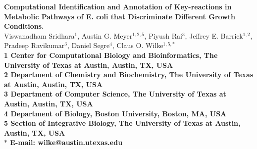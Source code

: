 \documentclass[12pt]{article}
\date{}
\begin{document}
\begin{flushleft}
{\Large
\textbf{Computational Identification and Annotation of Key-reactions in Metabolic Pathways of E. coli that Discriminate Different Growth Conditions.}
}
\bigskip
\noindent
\\
Viswanadham Sridhara$^{1}$,
Austin G. Meyer$^{1,2,5}$,
Piyush Rai$^{3}$,
Jeffrey E. Barrick$^{1,2}$,
Pradeep Ravikumar$^{3}$,
Daniel Segre$^{4}$, 
Claus O. Wilke$^{1,5,\ast}$
\\
\bigskip
\bf{1} Center for Computational Biology and Bioinformatics, The University of Texas at Austin, Austin, TX, USA
\\
\bf{2} Department of Chemistry and Biochemistry, The University of Texas at Austin, Austin, TX, USA
\\
\bf{3} Department of Computer Science, The University of Texas at Austin, Austin, TX, USA
\\
\bf{4} Department of Biology, Boston University, Boston, MA, USA
\\
\bf{5} Section of Integrative Biology, The University of Texas at Austin, Austin, TX, USA
\\
\bigskip
$\ast$ E-mail: wilke@austin.utexas.edu
\end{flushleft}
\newpage
\end{document}
